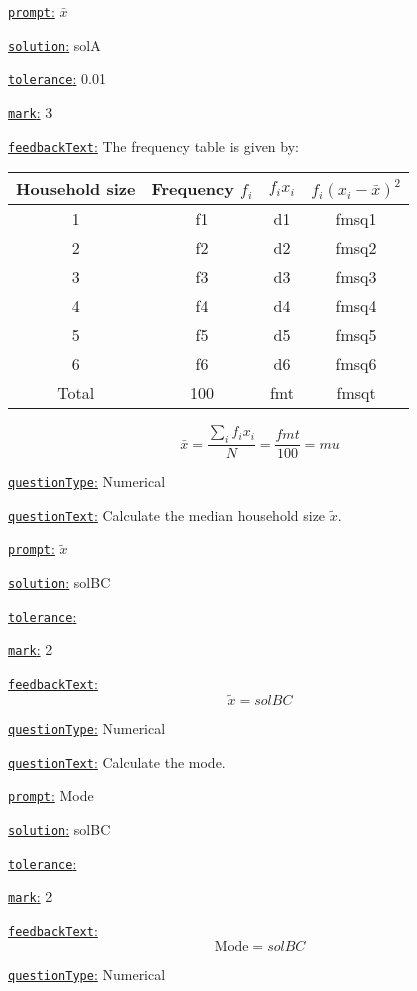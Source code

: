 \documentclass[preview]{standalone}
\newcommand \fieldname[1]{\underline{\texttt{#1}:}}
\begin{document}
\fieldname{prompt}
$\bar x$

\fieldname{solution}
solA

\fieldname{tolerance}
0.01

\fieldname{mark}
3

\fieldname{feedbackText}
The frequency table is given by:

\begin{tabular}{cccc}
Household size & Frequency $f_i$ & $f_i x_i$ & $f_i (x_i-\bar x)^2$\\
\hline
1 & {f1} & {d1} & {fmsq1}\\
2 & {f2} & {d2} & {fmsq2}\\
3 & {f3} & {d3} & {fmsq3}\\
4 & {f4} & {d4} & {fmsq4}\\
5 & {f5} & {d5} & {fmsq5}\\
6 & {f6} & {d6} & {fmsq6}\\
\hline
Total & 100 & {fmt} & {fmsqt} \\
\hline
\end{tabular}

\[
\bar x = \frac{\sum_i f_i x_i}{N} =\frac{fmt}{100} = {mu}
\]

\fieldname{questionType}
Numerical

\fieldname{questionText}
Calculate the median household size $\tilde x$.

\fieldname{prompt}
$\tilde x$

\fieldname{solution}
solBC

\fieldname{tolerance}


\fieldname{mark}
2

\fieldname{feedbackText}
\[
\tilde x = {solBC}
\]

\fieldname{questionType}
Numerical

\fieldname{questionText}
Calculate the mode.

\fieldname{prompt}
Mode

\fieldname{solution}
solBC

\fieldname{tolerance}


\fieldname{mark}
2

\fieldname{feedbackText}
\[
\textrm{Mode} = {solBC}
\]

\fieldname{questionType}
Numerical
\end{document}
